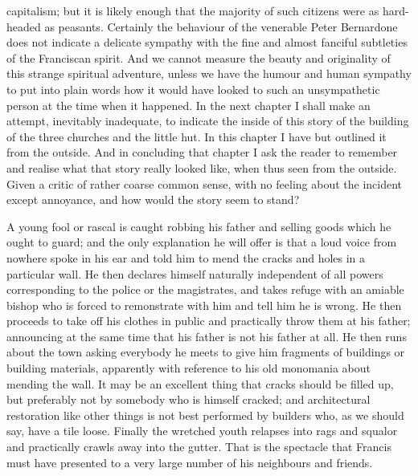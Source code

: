 \documentclass{book}
\begin{document}
capitalism; but it is likely enough that the majority of such citizens were as hard-headed as peasants. Certainly the behaviour of the venerable Peter Bernardone does not indicate a delicate sympathy with the fine and almost fanciful subtleties of the Franciscan spirit. And we cannot measure the beauty and originality of this strange spiritual adventure, unless we have the humour and human sympathy to put into plain words how it would have looked to such an unsympathetic person at the time when it happened. In the next chapter I shall make an attempt, inevitably inadequate, to indicate the inside of this story of the building of the three churches and the little hut. In this chapter I have but outlined it from the outside. And in concluding that chapter I ask the reader to remember and realise what that story really looked like, when thus seen from the outside. Given a critic of rather coarse common sense, with no feeling about the incident except annoyance, and how would the story seem to stand?

A young fool or rascal is caught robbing his father and selling goods which he ought to guard; and the only explanation he will offer is that a loud voice from nowhere spoke in his ear and told him to mend the cracks and holes in a particular wall. He then declares himself naturally independent of all powers corresponding to the police or the magistrates, and takes refuge with an amiable bishop who is forced to remonstrate with him and tell him he is wrong. He then proceeds to take off his clothes in public and practically throw them at his father; announcing at the same time that his father is not his father at all. He then runs about the town asking everybody he meets to give him fragments of buildings or building materials, apparently with reference to his old monomania about mending the wall. It may be an excellent thing that cracks should be filled up, but preferably not by somebody who is himself cracked; and architectural restoration like other things is not best performed by builders who, as we should say, have a tile loose. Finally the wretched youth relapses into rags and squalor and practically crawls away into the gutter. That is the spectacle that Francis must have presented to a very large number of his neighbours and friends.
\end{document}
